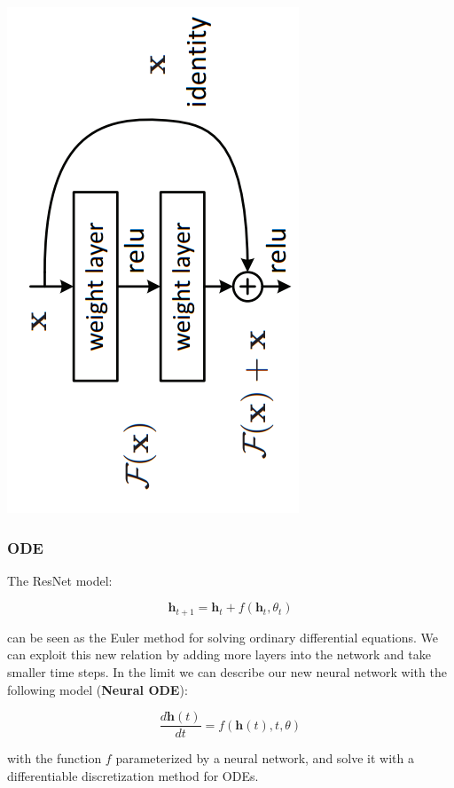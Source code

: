\documentclass{beamer}
\begin{document}
{\begin{frame}
	\begin{center}
	\includegraphics[scale = 0.4]{resnet.png}
         \end{center}

\end{frame}
\begin{frame}
	\frametitle{ODE}
	The ResNet model:

	\begin{equation}
	\textbf{h}_{t+1} =\textbf{h}_t + f(\textbf{h}_t, \theta_t)
	\end{equation}

	can be seen as  the Euler method for solving ordinary differential equations. We can exploit this new relation by adding more layers into the network and take smaller time steps.  In the limit we can describe our new neural network with the following model (\textbf{Neural ODE}):

	\begin{equation}
	\frac{d \textbf{h}(t)}{dt} = f(\textbf{h}(t), t, \theta)
	\end{equation}

	 with the function $f$ parameterized by a neural network, and solve it with a differentiable discretization method for ODEs.
\end{frame}

}
\end{document}
